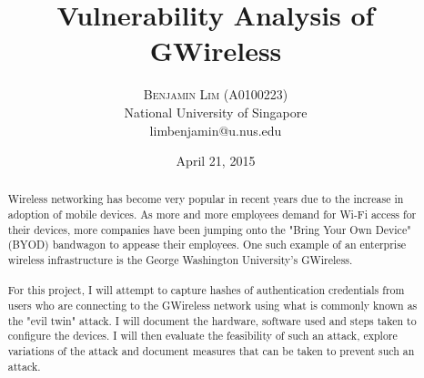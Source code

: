 \documentclass[twoside]{article}
\title{\vspace{-15mm}\fontsize{24pt}{10pt}\selectfont\textbf{Vulnerability Analysis of GWireless}}
\author{
\large
\textsc{Benjamin Lim (A0100223)}\\[2mm] \normalsize National University of Singapore \\ \normalsize limbenjamin@u.nus.edu \\ }
\date{April 21, 2015}
\begin{document}
\maketitle 

\thispagestyle{fancy} 



\begin{abstract}

\noindent Wireless networking has become very popular in recent years due to the increase in adoption of mobile devices. As more and more employees demand for Wi-Fi access for their devices, more companies have been jumping onto the "Bring Your Own Device" (BYOD) bandwagon\cite{1} to appease their employees. One such example of an enterprise wireless infrastructure is the George Washington University's GWireless.
\\
\\For this project, I will attempt to capture hashes of authentication credentials from users who are connecting to the GWireless network using what is commonly known as the "evil twin" attack. I will document the hardware, software used and steps taken to configure the devices. I will then evaluate the feasibility of such an attack, explore variations of the attack and document measures that can be taken to prevent such an attack.

\end{abstract}
\end{document}
